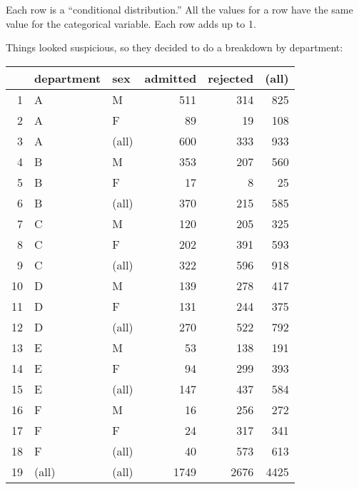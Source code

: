 \documentclass[landscape]{exam}
\begin{document}
  Each row is a ``conditional distribution.'' All the values for a row have the
  same value for the categorical variable. Each row adds up to 1.

  Things looked suspicious, so they decided to do a breakdown by department:

  \begin{table}[H]
    \centering
    \begin{tabular}{rllrrr}
      \toprule
                 & department & sex   & admitted & rejected & (all) \\
      \midrule
      1          & A          & M     & 511      & 314      & 825 \\
      2          & A          & F     & 89       & 19       & 108 \\
      3          & A          & (all) & 600      & 333      & 933 \\
      \midrule
      4          & B          & M     & 353      & 207      & 560 \\
      5          & B          & F     & 17       & 8        & 25 \\
      6          & B          & (all) & 370      & 215      & 585 \\
      \midrule
      7          & C          & M     & 120      & 205      & 325 \\
      8          & C          & F     & 202      & 391      & 593 \\
      9          & C          & (all) & 322      & 596      & 918 \\
      \midrule
      10         & D          & M     & 139      & 278      & 417 \\
      11         & D          & F     & 131      & 244      & 375 \\
      12         & D          & (all) & 270      & 522      & 792 \\
      \midrule
      13         & E          & M     & 53       & 138      & 191 \\
      14         & E          & F     & 94       & 299      & 393 \\
      15         & E          & (all) & 147      & 437      & 584 \\
      \midrule
      16         & F          & M     & 16       & 256      & 272 \\
      17         & F          & F     & 24       & 317      & 341 \\
      18         & F          & (all) & 40       & 573      & 613 \\
      \midrule
      19         & (all)      & (all) & 1749     & 2676     & 4425 \\
      \bottomrule
    \end{tabular}
  \end{table}
\end{document}
